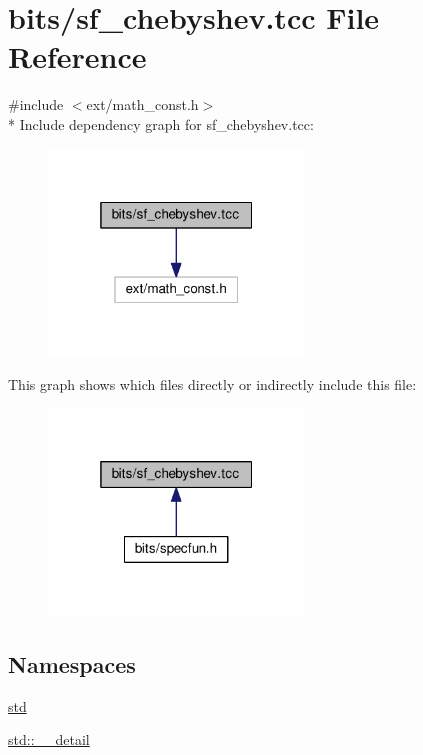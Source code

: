 \hypertarget{sf__chebyshev_8tcc}{}\section{bits/sf\+\_\+chebyshev.tcc File Reference}
\label{sf__chebyshev_8tcc}
{\ttfamily \#include $<$ext/math\+\_\+const.\+h$>$}\\*
Include dependency graph for sf\+\_\+chebyshev.\+tcc\+:
\nopagebreak
\begin{figure}[H]
\begin{center}
\leavevmode
\includegraphics[width=193pt]{sf__chebyshev_8tcc__incl}
\end{center}
\end{figure}
This graph shows which files directly or indirectly include this file\+:
\nopagebreak
\begin{figure}[H]
\begin{center}
\leavevmode
\includegraphics[width=193pt]{sf__chebyshev_8tcc__dep__incl}
\end{center}
\end{figure}
\subsection*{Namespaces}
\begin{DoxyCompactItemize}
\item 
 \hyperlink{namespacestd}{std}
\item 
 \hyperlink{namespacestd_1_1____detail}{std\+::\+\_\+\+\_\+detail}
\end{DoxyCompactItemize}
